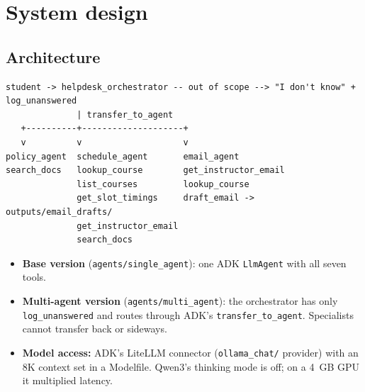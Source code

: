 \documentclass[11pt,a4paper]{article}
\newcommand{\code}[1]{\texttt{#1}}
\begin{document}
\section{System design}

\subsection{Architecture}
\begin{lstlisting}
student -> helpdesk_orchestrator -- out of scope --> "I don't know" + log_unanswered
              | transfer_to_agent
   +----------+--------------------+
   v          v                    v
policy_agent  schedule_agent       email_agent
search_docs   lookup_course        get_instructor_email
              list_courses         lookup_course
              get_slot_timings     draft_email -> outputs/email_drafts/
              get_instructor_email
              search_docs
\end{lstlisting}

\begin{itemize}
  \item \textbf{Base version} (\code{agents/single\_agent}): one ADK \code{LlmAgent} with all seven tools.
  \item \textbf{Multi-agent version} (\code{agents/multi\_agent}): the orchestrator has only
        \code{log\_unanswered} and routes through ADK's \code{transfer\_to\_agent}. Specialists cannot transfer
        back or sideways.
  \item \textbf{Model access:} ADK's LiteLLM connector (\code{ollama\_chat/} provider) with an 8K context set in
        a Modelfile. Qwen3's thinking mode is off; on a 4~GB GPU it multiplied latency.
\end{itemize}
\end{document}

